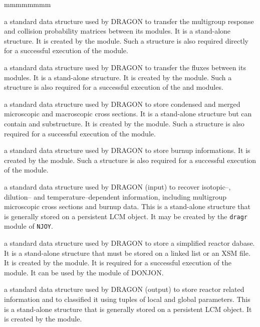 \begin{ListeDeDescription}{mmmmmmmm}
\item[\dds{asmpij}] a standard data structure used by DRAGON to transfer the
multigroup response and collision probability matrices between its modules. It
is a stand-alone structure. It is created by the  module. Such a
structure is also required directly for a successful execution of the
 module.

\item[\dds{fluxunk}] a standard data structure used by DRAGON to transfer the
fluxes  between its modules. It is a stand-alone structure. It is created
by the  module. Such a structure is also
required for a successful execution of the  and  modules.

\item[\dds{edition}] a standard data structure used by DRAGON to store
condensed and merged microscopic and macroscopic cross sections. It is a
stand-alone structure but can contain  and 
substructure. It is created by the  module. Such
a structure is also required for a successful execution of the 
module.

\item[\dds{burnup}] a standard data structure used by DRAGON to store
burnup informations. It is created by the  module.  Such
a structure is also required for a successful execution of the 
module.

\item[\dds{draglib}] a standard data structure used by DRAGON (input) to recover isotopic--, dilution--
and temperature--dependent information, including multigroup microscopic cross
sections and burnup data. This is a stand-alone structure that is generally
stored on a persistent LCM object. It may be created
by the {\tt dragr} module of {\tt NJOY}.

\item[\dds{cpo}] a standard data structure used by DRAGON to store
a simplified reactor dabase. It is a stand-alone structure that must be stored on a
linked list or an XSM file. It is created by the  module. It is required for a successful execution of the 
module. It can be used by the  module of DONJON.

\item[\dds{multicompo}] a standard data structure used by DRAGON (output) to store
reactor related information and to classified it using tuples of local and global
parameters. This is a stand-alone structure that is generally
stored on a persistent LCM object. It is created by the  module.


\end{ListeDeDescription}
